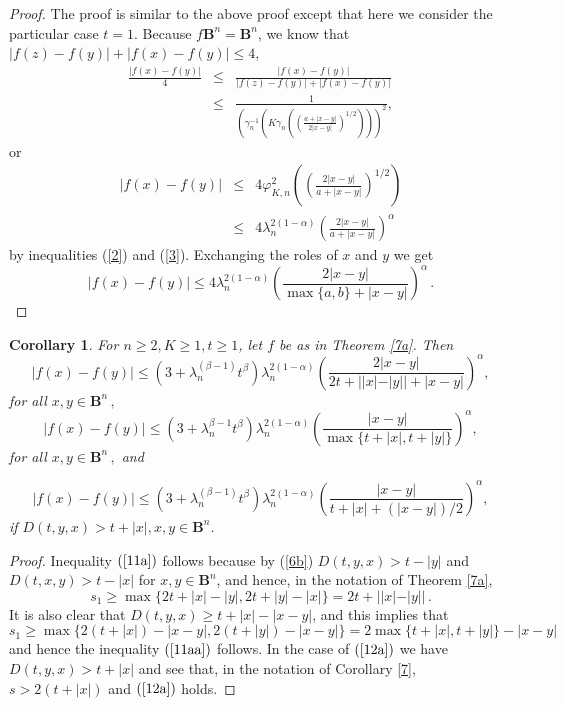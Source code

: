 \documentclass[12pt,a4paper,leqno]{amsart}
\theoremstyle{plain}
\newtheorem{corollary}[equation]{Corollary}
\numberwithin{equation}{section}          %
\begin{document}
\begin{proof} The proof is similar to the above proof except that here we consider the particular case $t=1$.
Because $f\mathbf{B}^n=\mathbf{B}^n$, we know that $|f(z)-f(y)|+|f(x)-f(y)|\leq 4$,
\begin{eqnarray*}
\frac{|f(x)-f(y)|}{4}&\leq & \frac{|f(x)-f(y)|}{|f(z)-f(y)|+|f(x)-f(y)|}\\
                     &\leq & \displaystyle\frac{1}{\left(\gamma_n^{-1}\left(K\gamma_n\left(\left
(\displaystyle\frac{a+|x-y|}{2|x-y|}\right)^{1/2}\right)\right)\right)^2},
\end{eqnarray*}
or
\begin{eqnarray*}
|f(x)-f(y)|&\leq & 4 \varphi_{K,n}^2\left(\left(\frac{2|x-y|}{a+|x-y|}\right)^{1/2}\right)\\
            &\leq & 4\lambda_n^{2(1-\alpha)}\left(\frac{2|x-y|}{a+|x-y|}\right)^\alpha
\end{eqnarray*}
by inequalities (\ref{2}) and (\ref{3}). Exchanging the roles of $x$
and $y$ we get
$$|f(x)-f(y)| \leq  4\lambda_n^{2(1-\alpha)}\left(\frac{2|x-y|}{\max\{a,b\}+|x-y|}\right)^\alpha \,.$$
\end{proof}


\begin{corollary}\label{9a} For $n\geq 2, K\geq 1, t\ge 1$, let $f$ be as in Theorem \ref{7a}. Then
\begin{equation}\label{11a}
|f(x)-f(y)| \leq  (3+\lambda_n^{(\beta-1)}t^\beta)\lambda_n^{2(1-\alpha)}
\left(\frac{2|x-y|}{2t+||x|-|y||+|x-y|}\right)^\alpha,
\end{equation}
for all $x,y\in \mathbf{B}^n\,,$
\begin{equation}\label{11aa}
|f(x)-f(y)| \leq (3+\lambda_n^{\beta-1}t^\beta)\lambda_n^{2(1-\alpha)}
\left(\frac{|x-y|}{\max\{t+|x|,t+|y|\}}\right)^\alpha,
\end{equation}
for all $x,y\in \mathbf{B}^n\,,$ and

\begin{equation}\label{12a}
|f(x)-f(y)| \leq (3+\lambda_n^{(\beta-1)}t^\beta)\lambda_n^{2(1-\alpha)}
\left(\frac{|x-y|}{t+|x|+(|x-y|)/2}\right)^\alpha,
\end{equation}
if $D(t,y,x)>t+|x|, x,y\in \mathbf{B}^n$.
\end{corollary}

\begin{proof} %
Inequality $(\ref{11a})$ follows because by (\ref{6b})
$D(t,y,x)>t-|y|$ and $D(t,x,y)>t-|x|$ for  $x,y \in \mathbf{B}^n$,
and hence, in the notation of Theorem \ref{7a},
$$s_1\geq\max\{2t+|x|-|y|,2t+|y|-|x|\}=2t+||x|-|y||\,.$$
It is also clear that $D(t,y,x)\geq t+|x|-|x-y|$, and this      %
implies that
$$s_1\geq \max \{2(t+|x|)-|x-y|,2(t+|y|)-|x-y|\}=
2 \max\{t+|x|,t+|y|\}-|x-y|$$ and hence the inequality $(\ref{11aa})$
follows. In the case of $(\ref{12a})$ we have $D(t,y,x)>t+|x|$ and see that, in the notation of
Corollary \ref{7}, $s>2(t+|x|)$ and $(\ref{12a})$ holds.
\end{proof}
\end{document}
